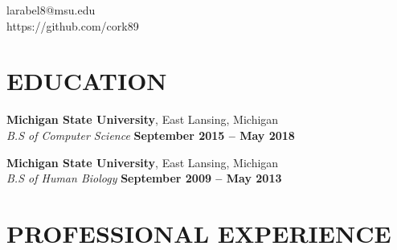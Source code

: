 \documentclass[margin,line]{resume}
\begin{document}
{
    \vspace{2mm}\hfill larabel8@msu.edu       \vspace{0mm}\\\vspace{0mm}%
    \vspace{-7mm}\hfill https://github.com/cork89 \vspace{0mm}\\\vspace{-9mm}%
}

\begin{resume}

    \vspace{5mm}

    \section{\mysidestyle \textbf{\large{E}\small{DUCATION}}}

    \textbf{\listing Michigan State University}, East Lansing, Michigan \vspace{1mm}\\
    \textsl{B.S of Computer Science} \hfill \textbf{September 2015 -- May 2018}\vspace{-3mm}\\\vspace{-1mm}%

    \textbf{\listing Michigan State University}, East Lansing, Michigan \vspace{1mm}\\
    \textsl{B.S of Human Biology} \hfill \textbf{September 2009 -- May 2013}\vspace{-3mm}\\\vspace{-1mm}%

    \vspace{-1mm}

\sectionline

    \section{\mysidestyle \textbf{\large{P}\small{ROFESSIONAL} \large{E}\small{XPERIENCE}}}


\end{resume}
\end{document}

